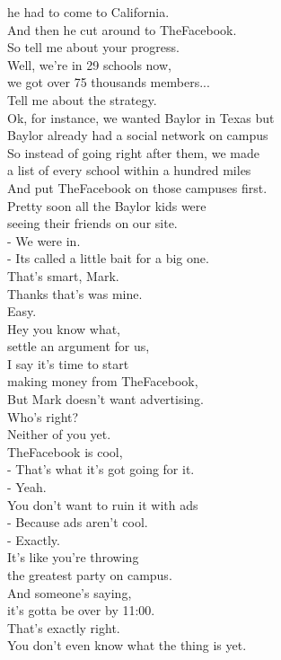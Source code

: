 \documentclass{article}
\begin{document}
\begin{multicols}{3}
he had to come to California.\\
And then he cut around to TheFacebook.\\
So tell me about your progress.\\
Well, we're in 29 schools now,\\
we got over 75 thousands members...\\
Tell me about the strategy.\\
Ok, for instance, we wanted Baylor in Texas but\\
Baylor already had a social network on campus\\
So instead of going right after them, we made\\
a list of every school within a hundred miles\\
And put TheFacebook on those campuses first.\\
Pretty soon all the Baylor kids were\\
seeing their friends on our site.\\
- We were in.\\
- Its called a little bait for a big one.\\
That's smart, Mark.\\
Thanks that's was mine.\\
Easy.\\
Hey you know what,\\
settle an argument for us,\\
I say it's time to start\\
making money from TheFacebook,\\
But Mark doesn't want advertising.\\
Who's right?\\
Neither of you yet.\\
TheFacebook is cool,\\
- That's what it's got going for it.\\
- Yeah.\\
You don't want to ruin it with ads\\
- Because ads aren't cool.\\
- Exactly.\\
It's like you're throwing\\
the greatest party on campus.\\
And someone's saying,\\
it's gotta be over by 11:00.\\
That's exactly right.\\
You don't even know what the thing is yet.\\

\end{multicols}
\end{document}

